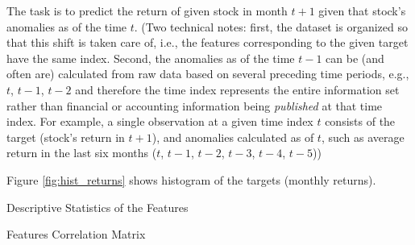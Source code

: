 		The task is to predict the return of given stock in month $t+1$ given that stock's anomalies as of the time $t$. (Two technical notes: first, the dataset is organized so that this shift is taken care of, i.e., the features corresponding to the given target have the same index. Second, the anomalies as of the time $t-1$ can be (and often are) calculated from raw data based on several preceding time periods, e.g., $t$, $t-1$, $t-2$ and therefore the time index  represents the entire information set rather than financial or accounting information being \textit{published} at that time index. For example, a single observation at a given time index $t$ consists of the target (stock's return in $t+1$), and anomalies calculated as of $t$, such as average return in the last six months ($t$, $t-1$, $t-2$, $t-3$, $t-4$, $t-5$))
		
		Figure \ref{fig:hist_returns} shows histogram of the targets (monthly returns). 
		
		
		
	
		\begin{table}
			\resizebox{\textwidth}{!}{}
			\caption{Descriptive Statistics of the Features}
			\label{tab:descr}
		\end{table}
	
		\begin{table}
			\begin{adjustbox}{scale=0.4,center}
				
			\end{adjustbox}
			\caption{Features Correlation Matrix}
			\label{tab:correlation_matrix}
		\end{table}
	
